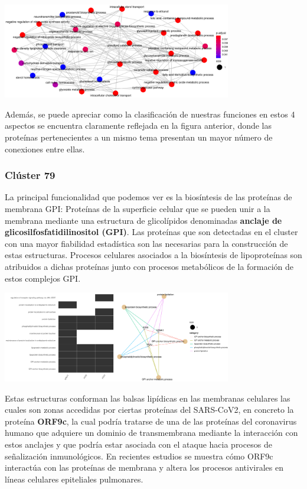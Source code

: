 \begin{center}
\vspace{1.5ex}
\includegraphics[width=100mm,scale=1]{report/figures/enrichGO_enrichmap-BP-84.pdf}
\vspace{1.5ex}
\end{center}

Además, se puede apreciar como la clasificación de nuestras funciones en estos 4 aspectos se encuentra claramente reflejada en la figura anterior, donde las proteínas pertenecientes a un mismo tema presentan un mayor número de conexiones entre ellas.

\subsubsection{Clúster 79}
La principal funcionalidad que podemos ver es la biosíntesis de las proteínas de membrana GPI: Proteínas de la superficie celular que se pueden unir a la membrana mediante una estructura de glicolípidos denominadas \textbf{anclaje de glicosilfosfatidilinositol (GPI)}. Las proteínas que son detectadas en el cluster con una mayor fiabilidad estadística son las necesarias para la construcción de estas estructuras. Procesos celulares asociados a la biosíntesis de lipoproteínas son atribuidos a dichas proteínas junto con procesos metabólicos de la formación de estos complejos GPI. 

\begin{center}
\includegraphics[width=100mm,scale=1.1]{report/figures/enrichGO_heatmap_cnetplot-BP-79.pdf}
\end{center}
\vspace{1.5ex}


Estas estructuras conforman las balsas lipídicas en las membranas celulares las cuales son zonas accedidas por ciertas proteínas del SARS-CoV2, en concreto la proteína \textbf{ORF9c}, la cual podría tratarse de una de las proteínas del coronavirus humano que adquiere un dominio de transmembrana mediante la interacción con estos anclajes y que podría estar asociada con el ataque hacia procesos de señalización inmunológicos. En recientes estudios se muestra cómo ORF9c interactúa con las proteínas de membrana y altera los procesos antivirales en líneas celulares epiteliales pulmonares.

